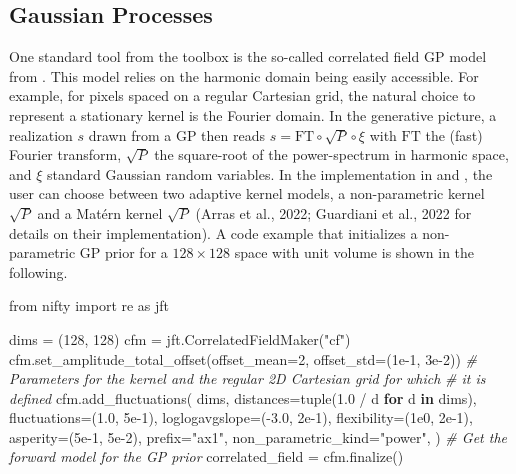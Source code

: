 \documentclass[10pt,a4paper,onecolumn]{article}
\let\textttOrig=\texttt
\def\texttt#1{\expandafter\textttOrig{\seqsplit{#1}}}
\newenvironment{Shaded}{}{}
\newcommand{\BuiltInTok}[1]{#1}
\newcommand{\CommentTok}[1]{\textcolor[rgb]{0.38,0.63,0.69}{\textit{#1}}}
\newcommand{\ControlFlowTok}[1]{\textcolor[rgb]{0.00,0.44,0.13}{\textbf{#1}}}
\newcommand{\DecValTok}[1]{\textcolor[rgb]{0.25,0.63,0.44}{#1}}
\newcommand{\FloatTok}[1]{\textcolor[rgb]{0.25,0.63,0.44}{#1}}
\newcommand{\ImportTok}[1]{#1}
\newcommand{\KeywordTok}[1]{\textcolor[rgb]{0.00,0.44,0.13}{\textbf{#1}}}
\newcommand{\NormalTok}[1]{#1}
\newcommand{\OperatorTok}[1]{\textcolor[rgb]{0.40,0.40,0.40}{#1}}
\newcommand{\StringTok}[1]{\textcolor[rgb]{0.25,0.44,0.63}{#1}}
\begin{document}
\hypertarget{gaussian-processes}{%
\subsection{Gaussian Processes}\label{gaussian-processes}}

One standard tool from the \texttt{NIFTy.re} toolbox is the so-called
correlated field GP model from \texttt{NIFTy}. This model relies on the
harmonic domain being easily accessible. For example, for pixels spaced
on a regular Cartesian grid, the natural choice to represent a
stationary kernel is the Fourier domain. In the generative picture, a
realization \(s\) drawn from a GP then reads
\(s = \mathrm{FT} \circ \sqrt{P} \circ \xi\) with \(\mathrm{FT}\) the
(fast) Fourier transform, \(\sqrt{P}\) the square-root of the
power-spectrum in harmonic space, and \(\xi\) standard Gaussian random
variables. In the implementation in \texttt{NIFTy.re} and
\texttt{NIFTy}, the user can choose between two adaptive kernel models,
a non-parametric kernel \(\sqrt{P}\) and a Matérn kernel \(\sqrt{P}\)
(Arras et al., 2022; Guardiani et al., 2022 for details on their
implementation). A code example that initializes a non-parametric GP
prior for a \(128 \times 128\) space with unit volume is shown in the
following.

\begin{Shaded}
\begin{Highlighting}[]
\ImportTok{from}\NormalTok{ nifty }\ImportTok{import}\NormalTok{ re }\ImportTok{as}\NormalTok{ jft}

\NormalTok{dims }\OperatorTok{=}\NormalTok{ (}\DecValTok{128}\NormalTok{, }\DecValTok{128}\NormalTok{)}
\NormalTok{cfm }\OperatorTok{=}\NormalTok{ jft.CorrelatedFieldMaker(}\StringTok{"cf"}\NormalTok{)}
\NormalTok{cfm.set\_amplitude\_total\_offset(offset\_mean}\OperatorTok{=}\DecValTok{2}\NormalTok{, offset\_std}\OperatorTok{=}\NormalTok{(}\FloatTok{1e{-}1}\NormalTok{, }\FloatTok{3e{-}2}\NormalTok{))}
\CommentTok{\# Parameters for the kernel and the regular 2D Cartesian grid for which}
\CommentTok{\# it is defined}
\NormalTok{cfm.add\_fluctuations(}
\NormalTok{  dims,}
\NormalTok{  distances}\OperatorTok{=}\BuiltInTok{tuple}\NormalTok{(}\FloatTok{1.0} \OperatorTok{/}\NormalTok{ d }\ControlFlowTok{for}\NormalTok{ d }\KeywordTok{in}\NormalTok{ dims),}
\NormalTok{  fluctuations}\OperatorTok{=}\NormalTok{(}\FloatTok{1.0}\NormalTok{, }\FloatTok{5e{-}1}\NormalTok{),}
\NormalTok{  loglogavgslope}\OperatorTok{=}\NormalTok{(}\OperatorTok{{-}}\FloatTok{3.0}\NormalTok{, }\FloatTok{2e{-}1}\NormalTok{),}
\NormalTok{  flexibility}\OperatorTok{=}\NormalTok{(}\FloatTok{1e0}\NormalTok{, }\FloatTok{2e{-}1}\NormalTok{),}
\NormalTok{  asperity}\OperatorTok{=}\NormalTok{(}\FloatTok{5e{-}1}\NormalTok{, }\FloatTok{5e{-}2}\NormalTok{),}
\NormalTok{  prefix}\OperatorTok{=}\StringTok{"ax1"}\NormalTok{,}
\NormalTok{  non\_parametric\_kind}\OperatorTok{=}\StringTok{"power"}\NormalTok{,}
\NormalTok{)}
\CommentTok{\# Get the forward model for the GP prior}
\NormalTok{correlated\_field }\OperatorTok{=}\NormalTok{ cfm.finalize()}
\end{Highlighting}
\end{Shaded}
\end{document}
